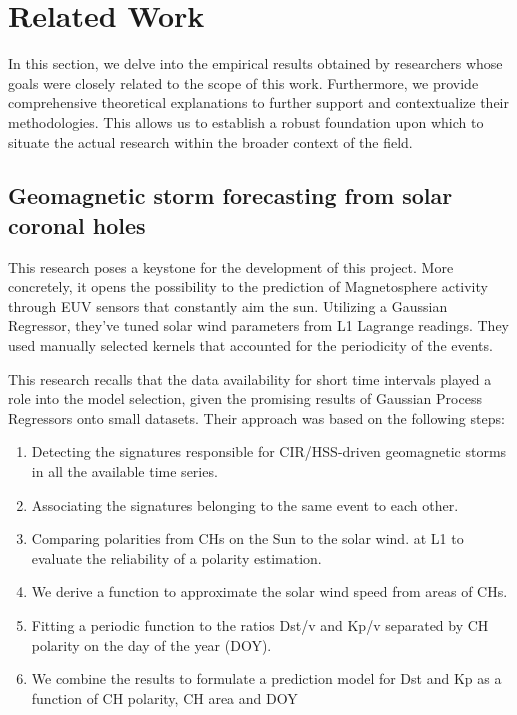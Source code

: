 \documentclass{article}
\begin{document}
\section{Related Work}
In this section, we delve into the empirical results obtained by researchers whose goals were closely related to the scope of this work. Furthermore, we provide comprehensive theoretical explanations to further support and contextualize their methodologies. This allows us to establish a robust foundation upon which to situate the actual research within the broader context of the field.

\subsection{Geomagnetic storm forecasting from solar coronal holes}
This research \cite{cme_pred_1} poses a keystone for the development of this project. More concretely, it opens the possibility to the prediction of Magnetosphere activity through EUV sensors that constantly aim the sun. Utilizing a Gaussian Regressor, they've tuned solar wind parameters from L1 Lagrange readings. They used manually selected kernels that accounted for the periodicity of the events.

This research recalls that the data availability for short time intervals played a role into the model selection, given the promising results of Gaussian Process Regressors onto small datasets. Their approach was based on the following steps:

\begin{enumerate}
    \item Detecting the signatures responsible for CIR/HSS-driven geomagnetic storms in all the available time series.
    \item Associating the signatures belonging to the same event to each other.
    \item Comparing polarities from CHs on the Sun to the solar wind. at L1 to evaluate the reliability of a polarity estimation.
    \item We derive a function to approximate the solar wind speed from areas of CHs.
    \item Fitting a periodic function to the ratios Dst/v and Kp/v separated by CH polarity on the day of the year (DOY).
    \item We combine the results to formulate a prediction model for Dst and Kp as a function of CH polarity, CH area and DOY
\end{enumerate}
\end{document}
